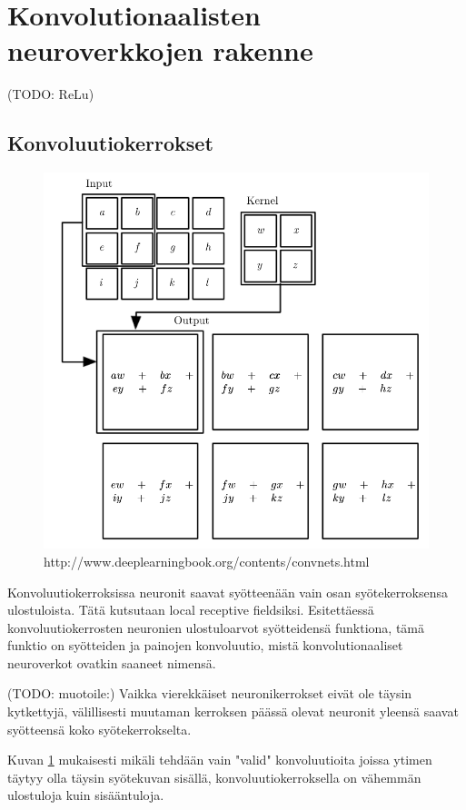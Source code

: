 \documentclass[finnish]{tktltiki2}
\theoremstyle{definition}
\theoremstyle{remark}
\begin{document}
  \section{Konvolutionaalisten neuroverkkojen rakenne}
  (TODO: ReLu)
  \subsection{Konvoluutiokerrokset}

  \begin{figure}[h]
  \label{pic:convolution}
  \centering
  \includegraphics[scale=0.4]{convolution}
  \caption{http://www.deeplearningbook.org/contents/convnets.html}
  \end{figure}

  Konvoluutiokerroksissa neuronit saavat syötteenään vain osan syötekerroksensa ulostuloista. Tätä kutsutaan local receptive fieldsiksi. Esitettäessä konvoluutiokerrosten neuronien ulostuloarvot syötteidensä funktiona, tämä funktio on syötteiden ja painojen konvoluutio, mistä konvolutionaaliset neuroverkot ovatkin saaneet nimensä. 

  (TODO: muotoile:) Vaikka vierekkäiset neuronikerrokset eivät ole täysin kytkettyjä, välillisesti muutaman kerroksen päässä olevat neuronit yleensä saavat syötteensä koko syötekerrokselta.
  
  Kuvan \ref{pic:convolution} mukaisesti mikäli tehdään vain "valid" konvoluutioita joissa ytimen täytyy olla täysin syötekuvan sisällä, konvoluutiokerroksella on vähemmän ulostuloja kuin sisääntuloja.
\end{document}
